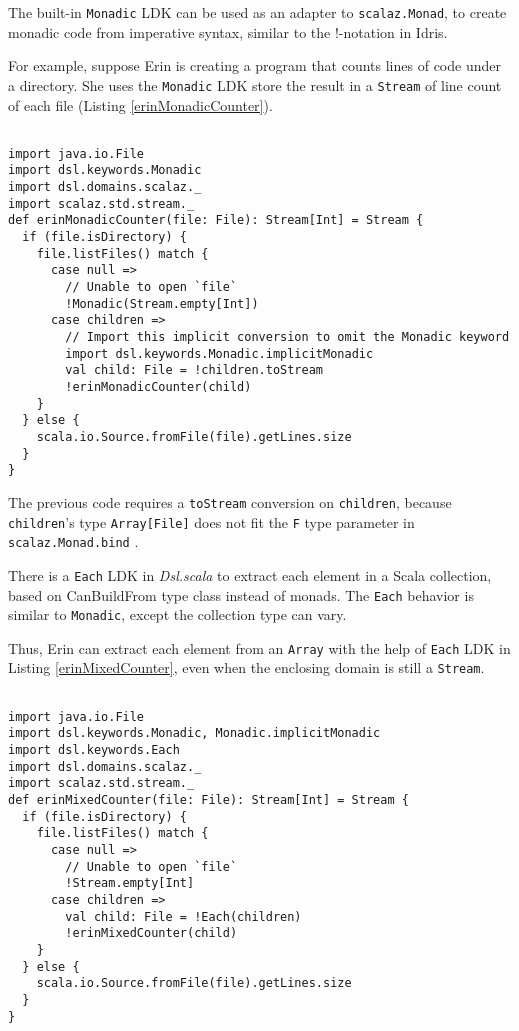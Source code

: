 The built-in \lstinline{Monadic} LDK can be used as an adapter to \lstinline{scalaz.Monad}, to create monadic code from imperative syntax, similar to the !-notation in Idris.

For example, suppose Erin is creating a program that counts lines of code under a directory. She uses the \lstinline{Monadic} LDK store the result in a \lstinline{Stream} of line count of each file (Listing \ref{erinMonadicCounter}).

\begin{lstlisting}[caption={Erin's line of code counter, the monadic version},label={erinMonadicCounter}]

import java.io.File
import dsl.keywords.Monadic
import dsl.domains.scalaz._
import scalaz.std.stream._
def erinMonadicCounter(file: File): Stream[Int] = Stream {
  if (file.isDirectory) {
    file.listFiles() match {
      case null =>
        // Unable to open `file`
        !Monadic(Stream.empty[Int])
      case children =>
        // Import this implicit conversion to omit the Monadic keyword
        import dsl.keywords.Monadic.implicitMonadic
        val child: File = !children.toStream
        !erinMonadicCounter(child)
    }
  } else {
    scala.io.Source.fromFile(file).getLines.size
  }
}
\end{lstlisting}

The previous code requires a \lstinline{toStream} conversion on \lstinline{children}, because \lstinline{children}'s type \lstinline{Array[File]} does not fit the \lstinline{F} type parameter in \lstinline{scalaz.Monad.bind} \cite{kenji2017scalaz}.

There is a \lstinline{Each} LDK in \textit{Dsl.scala} to extract each element in a Scala collection, based on {CanBuildFrom} type class instead of monads. The \lstinline{Each} behavior is similar to \lstinline{Monadic}, except the collection type can vary.

Thus, Erin can extract each element from an \lstinline{Array} with the help of \lstinline{Each} LDK in Listing \ref{erinMixedCounter},
even when the enclosing domain is still a \lstinline{Stream}.

\begin{lstlisting}[caption={Erin's line of code counter, mixed \lstinline{Monad}-based and \lstinline{CanBuildFrom}-based LDKs},label={erinMixedCounter}]

import java.io.File
import dsl.keywords.Monadic, Monadic.implicitMonadic
import dsl.keywords.Each
import dsl.domains.scalaz._
import scalaz.std.stream._
def erinMixedCounter(file: File): Stream[Int] = Stream {
  if (file.isDirectory) {
    file.listFiles() match {
      case null =>
        // Unable to open `file`
        !Stream.empty[Int]
      case children =>
        val child: File = !Each(children)
        !erinMixedCounter(child)
    }
  } else {
    scala.io.Source.fromFile(file).getLines.size
  }
}
\end{lstlisting}

